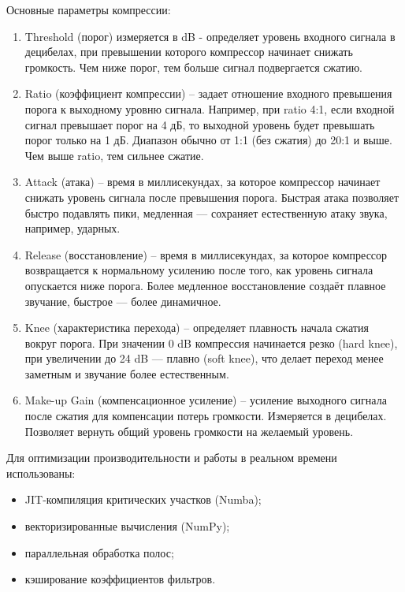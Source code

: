 Основные параметры компрессии:
\begin{enumerate}
	\item Threshold (порог) измеряется в dB - определяет уровень входного сигнала в децибелах, при превышении которого компрессор начинает снижать громкость. Чем ниже порог, тем больше сигнал подвергается сжатию.
	\item Ratio (коэффициент компрессии) – задает отношение входного превышения порога к выходному уровню сигнала. Например, при ratio 4:1, если входной сигнал превышает порог на 4 дБ, то выходной уровень будет превышать порог только на 1 дБ. Диапазон обычно от 1:1 (без сжатия) до 20:1 и выше. Чем выше ratio, тем сильнее сжатие.
	\item Attack (атака) – время в миллисекундах, за которое компрессор начинает снижать уровень сигнала после превышения порога. Быстрая атака позволяет быстро подавлять пики, медленная — сохраняет естественную атаку звука, например, ударных.
	\item Release (восстановление) – время в миллисекундах, за которое компрессор возвращается к нормальному усилению после того, как уровень сигнала опускается ниже порога. Более медленное восстановление создаёт плавное звучание, быстрое — более динамичное.
	\item Knee (характеристика перехода) – определяет плавность начала сжатия вокруг порога. При значении 0 dB компрессия начинается резко (hard knee), при увеличении до 24 dB — плавно (soft knee), что делает переход менее заметным и звучание более естественным.
	\item Make-up Gain (компенсационное усиление) – усиление выходного сигнала после сжатия для компенсации потерь громкости. Измеряется в децибелах. Позволяет вернуть общий уровень громкости на желаемый уровень.
\end{enumerate}

Для оптимизации производительности и работы в реальном времени использованы:
\begin{itemize}
	\item JIT-компиляция критических участков (Numba);
	\item векторизированные вычисления (NumPy);
	\item параллельная обработка полос;
	\item кэширование коэффициентов фильтров.
\end{itemize}

